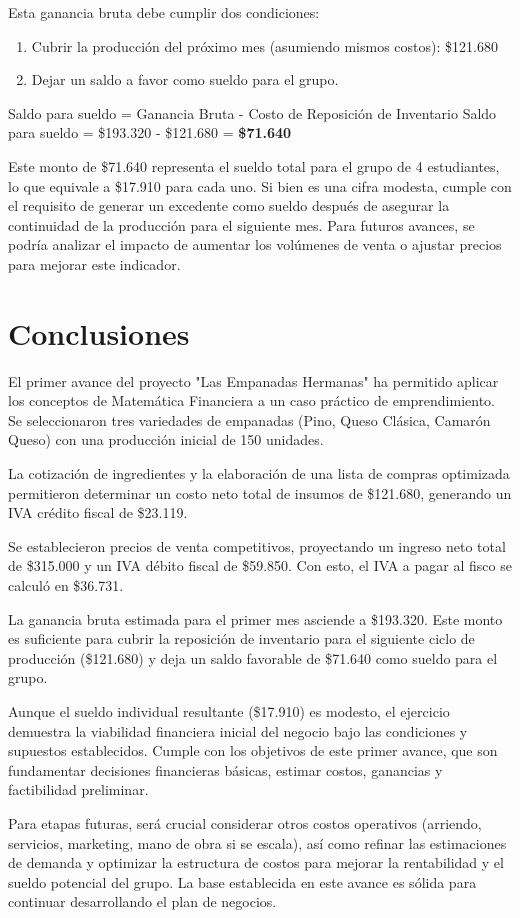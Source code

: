 \documentclass[12pt]{article}
\begin{document}
Esta ganancia bruta debe cumplir dos condiciones:
\begin{enumerate}
    \item Cubrir la producción del próximo mes (asumiendo mismos costos): \$121.680
    \item Dejar un saldo a favor como sueldo para el grupo.
\end{enumerate}
Saldo para sueldo = Ganancia Bruta - Costo de Reposición de Inventario
Saldo para sueldo = \$193.320 - \$121.680 = \textbf{\$71.640}

Este monto de \$71.640 representa el sueldo total para el grupo de 4 estudiantes, lo que equivale a \$17.910 para cada uno. Si bien es una cifra modesta, cumple con el requisito de generar un excedente como sueldo después de asegurar la continuidad de la producción para el siguiente mes. Para futuros avances, se podría analizar el impacto de aumentar los volúmenes de venta o ajustar precios para mejorar este indicador.

\newpage
\section{Conclusiones} %
El primer avance del proyecto "Las Empanadas Hermanas" ha permitido aplicar los conceptos de Matemática Financiera a un caso práctico de emprendimiento. Se seleccionaron tres variedades de empanadas (Pino, Queso Clásica, Camarón Queso) con una producción inicial de 150 unidades.

La cotización de ingredientes y la elaboración de una lista de compras optimizada permitieron determinar un costo neto total de insumos de \$121.680, generando un IVA crédito fiscal de \$23.119.

Se establecieron precios de venta competitivos, proyectando un ingreso neto total de \$315.000 y un IVA débito fiscal de \$59.850. Con esto, el IVA a pagar al fisco se calculó en \$36.731.

La ganancia bruta estimada para el primer mes asciende a \$193.320. Este monto es suficiente para cubrir la reposición de inventario para el siguiente ciclo de producción (\$121.680) y deja un saldo favorable de \$71.640 como sueldo para el grupo.

Aunque el sueldo individual resultante (\$17.910) es modesto, el ejercicio demuestra la viabilidad financiera inicial del negocio bajo las condiciones y supuestos establecidos. Cumple con los objetivos de este primer avance, que son fundamentar decisiones financieras básicas, estimar costos, ganancias y factibilidad preliminar.

Para etapas futuras, será crucial considerar otros costos operativos (arriendo, servicios, marketing, mano de obra si se escala), así como refinar las estimaciones de demanda y optimizar la estructura de costos para mejorar la rentabilidad y el sueldo potencial del grupo. La base establecida en este avance es sólida para continuar desarrollando el plan de negocios.
\end{document}
